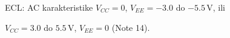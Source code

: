 \begin{frame}[label=10-s096]{ECL: AC karakteristike}
\setlength{\abovedisplayskip}{4pt}\setlength{\belowdisplayskip}{4pt}\setlength{\abovedisplayshortskip}{3pt}\setlength{\belowdisplayshortskip}{3pt}
$V_{CC}=0$, $V_{EE}=-3.0$ do $-5.5\,\mathrm V$, ili\par
$V_{CC}=3.0$ do $5.5\,\mathrm V$, $V_{EE}=0$ (Note 14).\par\vspace{1pt}

\end{frame}
